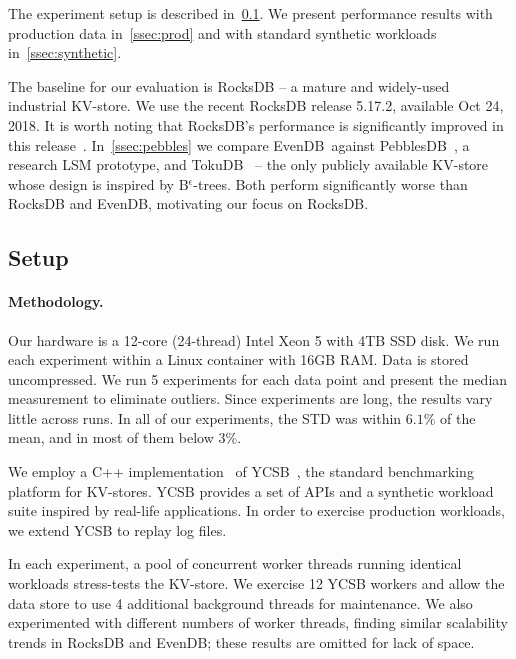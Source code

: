 \documentclass[sigplan,10pt]{acmart}
\newcommand{\sys}{EvenDB}
\begin{document}
The experiment setup is described in~\cref{ssec:setup}. 
We present performance results with production data in~\cref{ssec:prod} and with standard synthetic workloads in~\cref{ssec:synthetic}. 

The baseline for our evaluation is RocksDB -- a mature and widely-used industrial KV-store. 
We use the recent RocksDB release 5.17.2, available Oct 24, 2018.  It is worth noting that RocksDB's performance 
is significantly improved  in this release~\cite{CallaghanCompaction}.   
In~\cref{ssec:pebbles} we compare \sys\ against PebblesDB~\cite{PebblesDB}, a research LSM prototype, and TokuDB~\cite{TokuDB} 
-- the only publicly available KV-store whose design is inspired by B$^\epsilon$-trees. Both  perform significantly worse than RocksDB and \sys, 
motivating our focus on RocksDB.


 
\subsection{Setup}
\label{ssec:setup} 

\paragraph{Methodology.} 
Our hardware is a 12-core (24-thread) Intel Xeon 5  with 4TB SSD disk.  
We run each experiment within a Linux container with 16GB RAM. 
Data is stored uncompressed.
We run 5 experiments for each data point and present the median measurement to eliminate outliers. Since experiments are long, the results vary 
little across runs. In all of our experiments, the STD was within $6.1\%$ of the mean, and in most of them below $3\%$. 

We employ a C++ implementation~\cite{Cpp-YCSB} of YCSB~\cite{YCSB}, the  standard  
benchmarking platform for KV-stores. YCSB provides a set of APIs and a synthetic workload suite inspired 
by real-life applications. In order to exercise production workloads, we extend YCSB to replay log files.

In each experiment, a pool of concurrent worker threads running identical
workloads stress-tests the KV-store. We exercise 12 YCSB workers 
and allow the data store to use 4 additional background threads for maintenance.
We also experimented with different numbers of worker threads, finding similar scalability trends in RocksDB and 
\sys; these results are omitted for lack of space.
\end{document}
